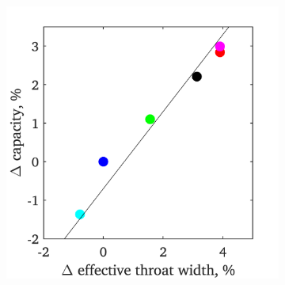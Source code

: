 \documentclass[a4paper, 11pt, oneside]{report}
\begin{document}
\begin{figure}[H]
	\centering
	\begin{subfigure}{.45\textwidth}
		\centering
		\includegraphics[width=\linewidth]{figs/t900_2d_capacities_vs_effective_throat_widths.png}
	\end{subfigure}
	\begin{subfigure}{.1125\textwidth}
		\centering

\end{subfigure}
\end{figure}
\end{document}
